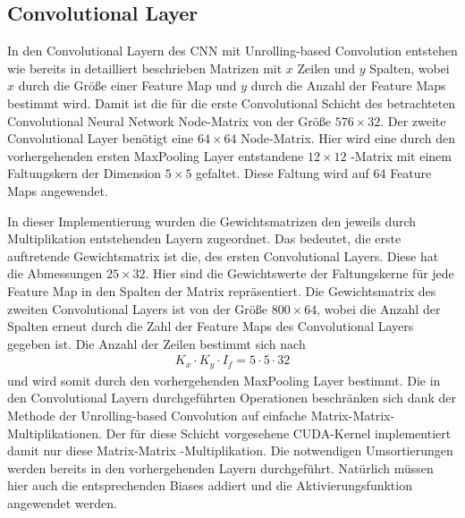 \documentclass[../main.tex]{subfiles}
\begin{document}
\subsection{Convolutional Layer} \label{sec:cuda_conv}
In den Convolutional Layern des CNN mit Unrolling-based Convolution entstehen wie bereits in  detailliert beschrieben Matrizen mit $x$ Zeilen und $y$ Spalten, wobei $x$ durch die Größe einer Feature Map und $y$ durch die Anzahl der Feature Maps bestimmt wird. Damit ist die für die erste Convolutional Schicht des betrachteten Convolutional Neural Network Node-Matrix von der Größe $576 \times 32$. Der zweite Convolutional Layer benötigt eine $64 \times 64$ Node-Matrix. Hier wird eine durch den vorhergehenden ersten MaxPooling Layer entstandene $12\times 12$ -Matrix mit einem Faltungskern der Dimension $5\times 5$ gefaltet. Diese Faltung wird auf 64 Feature Maps angewendet. \par In dieser Implementierung wurden die Gewichtsmatrizen den jeweils durch Multiplikation entstehenden Layern zugeordnet. Das bedeutet, die erste auftretende Gewichtsmatrix ist die, des ersten Convolutional Layers. Diese hat die Abmessungen $25\times 32$. Hier sind die Gewichtswerte der Faltungskerne für jede Feature Map in den Spalten der Matrix repräsentiert. Die Gewichtsmatrix des zweiten Convolutional Layers ist von der Größe $800 \times 64$, wobei die Anzahl der Spalten erneut durch die Zahl der Feature Maps des Convolutional Layers gegeben ist. Die Anzahl der Zeilen bestimmt sich nach \begin{align} \label{eq:cuda_spalten_pooling}
 K_x \cdot K_y \cdot I_f = 5\cdot5\cdot32 \end{align} und wird somit durch den vorhergehenden MaxPooling Layer bestimmt. Die in den Convolutional Layern durchgeführten Operationen beschränken sich dank der Methode der Unrolling-based Convolution auf einfache Matrix-Matrix-Multiplikationen. Der für diese Schicht vorgesehene CUDA-Kernel implementiert damit nur diese Matrix-Matrix -Multiplikation. Die notwendigen Umsortierungen werden bereits in den vorhergehenden Layern durchgeführt. Natürlich müssen hier auch die entsprechenden Biases addiert und die Aktivierungsfunktion angewendet werden. \par 
\end{document}
